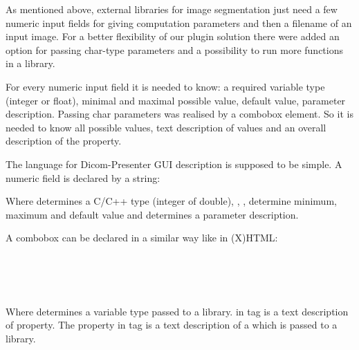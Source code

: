 As mentioned above, external libraries for image segmentation just need a few numeric input fields for giving computation parameters and then a filename of an input image. For a better flexibility of our plugin solution there were added an option for passing char-type parameters and a possibility to run more functions in a library.

For every numeric input field it is needed to know: a required variable type (integer or float), minimal and maximal possible value, default value, parameter description. Passing char parameters was realised by a combobox element. So it is needed to know all possible values, text description of values and an overall description of the property. 

The language for Dicom-Presenter GUI description is supposed to be simple. A numeric field is declared by a string:


Where  determines a C/C++ type (integer of double), , ,  determine minimum, maximum and default value and  determines a parameter description.

A combobox can be declared in a similar way like in (X)HTML:

\noindent \indent {}\\
\indent \indent {}\\
\indent \indent {}\\
\indent {}

Where  determines a variable type passed to a library.  in  tag is a text description of property. The  property in  tag is a text description of a  which is passed to a library.



